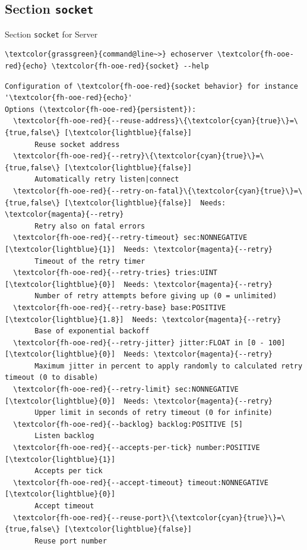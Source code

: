 \subsection{Section \textcolor{fh-ooe-red}{\lstinline|socket|}}

\begin{frame}[fragile]{Section \alert{\lstinline|socket|} for Server}
\begin{scriptsize}
\begin{Verbatim}[commandchars=\\\{\}]
\textcolor{grassgreen}{command@line~>} echoserver \textcolor{fh-ooe-red}{echo} \textcolor{fh-ooe-red}{socket} --help
\end{Verbatim}
\begin{Verbatim}[commandchars=\\\{\},frame=leftline,rulecolor=\color{fh-ooe-red}]
Configuration of \textcolor{fh-ooe-red}{socket behavior} for instance '\textcolor{fh-ooe-red}{echo}'
Options (\textcolor{fh-ooe-red}{persistent}):
  \textcolor{fh-ooe-red}{--reuse-address}\{\textcolor{cyan}{true}\}=\{true,false\} [\textcolor{lightblue}{false}]
       Reuse socket address
  \textcolor{fh-ooe-red}{--retry}\{\textcolor{cyan}{true}\}=\{true,false\} [\textcolor{lightblue}{false}]
       Automatically retry listen|connect
  \textcolor{fh-ooe-red}{--retry-on-fatal}\{\textcolor{cyan}{true}\}=\{true,false\} [\textcolor{lightblue}{false}]  Needs: \textcolor{magenta}{--retry}
       Retry also on fatal errors
  \textcolor{fh-ooe-red}{--retry-timeout} sec:NONNEGATIVE [\textcolor{lightblue}{1}]  Needs: \textcolor{magenta}{--retry}
       Timeout of the retry timer
  \textcolor{fh-ooe-red}{--retry-tries} tries:UINT [\textcolor{lightblue}{0}]  Needs: \textcolor{magenta}{--retry}
       Number of retry attempts before giving up (0 = unlimited)
  \textcolor{fh-ooe-red}{--retry-base} base:POSITIVE [\textcolor{lightblue}{1.8}]  Needs: \textcolor{magenta}{--retry}
       Base of exponential backoff
  \textcolor{fh-ooe-red}{--retry-jitter} jitter:FLOAT in [0 - 100] [\textcolor{lightblue}{0}]  Needs: \textcolor{magenta}{--retry}
       Maximum jitter in percent to apply randomly to calculated retry timeout (0 to disable)
  \textcolor{fh-ooe-red}{--retry-limit} sec:NONNEGATIVE [\textcolor{lightblue}{0}]  Needs: \textcolor{magenta}{--retry}
       Upper limit in seconds of retry timeout (0 for infinite)
  \textcolor{fh-ooe-red}{--backlog} backlog:POSITIVE [5]
       Listen backlog
  \textcolor{fh-ooe-red}{--accepts-per-tick} number:POSITIVE [\textcolor{lightblue}{1}]
       Accepts per tick
  \textcolor{fh-ooe-red}{--accept-timeout} timeout:NONNEGATIVE [\textcolor{lightblue}{0}]
       Accept timeout
  \textcolor{fh-ooe-red}{--reuse-port}\{\textcolor{cyan}{true}\}=\{true,false\} [\textcolor{lightblue}{false}]
       Reuse port number
\end{Verbatim}
\end{scriptsize}
\end{frame}
